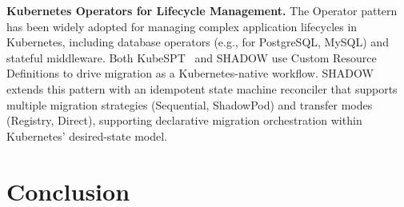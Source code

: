 \documentclass[conference]{IEEEtran}
\begin{document}
\textbf{Kubernetes Operators for Lifecycle Management.}
The Operator pattern~\cite{operatorpattern} has been widely adopted for managing
complex application lifecycles in Kubernetes, including database operators
(e.g., for PostgreSQL, MySQL) and stateful middleware. Both
KubeSPT~\cite{kubespt2025} and SHADOW use Custom Resource Definitions to drive
migration as a Kubernetes-native workflow. SHADOW extends this pattern with an
idempotent state machine reconciler that supports multiple migration strategies
(Sequential, ShadowPod) and transfer modes (Registry, Direct), supporting
declarative migration orchestration within Kubernetes' desired-state model.


\section{Conclusion}
\label{sec:conclusion}
\end{document}
